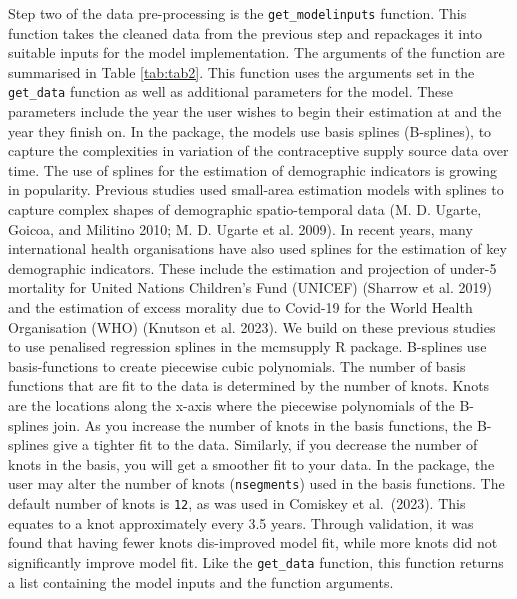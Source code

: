 Step two of the data pre-processing is the \texttt{get\_modelinputs} function. This function takes the cleaned data from the previous step and repackages it into suitable inputs for the model implementation. The arguments of the function are summarised in Table \ref{tab:tab2}. This function uses the arguments set in the \texttt{get\_data} function as well as additional parameters for the model. These parameters include the year the user wishes to begin their estimation at and the year they finish on. In the  package, the models use basis splines (B-splines), to capture the complexities in variation of the contraceptive supply source data over time. The use of splines for the estimation of demographic indicators is growing in popularity. Previous studies used small-area estimation models with splines to capture complex shapes of demographic spatio-temporal data (M. D. Ugarte, Goicoa, and Militino 2010; M. D. Ugarte et al. 2009). In recent years, many international health organisations have also used splines for the estimation of key demographic indicators. These include the estimation and projection of under-5 mortality for United Nations Children's Fund (UNICEF) (Sharrow et al. 2019) and the estimation of excess morality due to Covid-19 for the World Health Organisation (WHO) (Knutson et al. 2023). We build on these previous studies to use penalised regression splines in the mcmsupply R package. B-splines use basis-functions to create piecewise cubic polynomials. The number of basis functions that are fit to the data is determined by the number of knots. Knots are the locations along the x-axis where the piecewise polynomials of the B-splines join. As you increase the number of knots in the basis functions, the B-splines give a tighter fit to the data. Similarly, if you decrease the number of knots in the basis, you will get a smoother fit to your data. In the  package, the user may alter the number of knots (\texttt{nsegments}) used in the basis functions. The default number of knots is \texttt{12}, as was used in Comiskey et al.~(2023). This equates to a knot approximately every 3.5 years. Through validation, it was found that having fewer knots dis-improved model fit, while more knots did not significantly improve model fit. Like the \texttt{get\_data} function, this function returns a list containing the model inputs and the function arguments.

